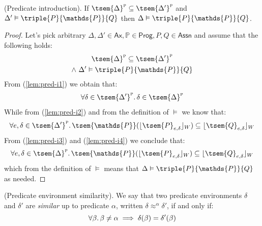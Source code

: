 \begin{lem}
	\label{lem:pred-i}
	(Predicate introduction).
	If $\tsem{\Delta}^\textsc{p} \subseteq \tsem{\Delta'}^\textsc{p}$ and $\Delta' \vDash \triple{P}{\mathds{P}}{Q}$ then $\Delta \vDash \triple{P}{\mathds{P}}{Q}$.
	\begin{proof}
		Let's pick arbitrary $\Delta, \Delta' \in \mathsf{Ax}, \mathds{P} \in \mathsf{Prog}, P, Q \in \mathsf{Assn}$ and assume that the following holds:
		\begin{gather}
			\label{lem:pred-i1} \tsem{\Delta}^\textsc{p} \subseteq \tsem{\Delta'}^\textsc{p} \\
			\label{lem:pred-i2} \land\ \Delta' \vDash \triple{P}{\mathds{P}}{Q}
		\end{gather}
		From (\ref{lem:pred-i1}) we obtain that:
		\begin{gather}
			\label{lem:pred-i3} \forall \delta \in \tsem{\Delta'}^\textsc{p} \ldotp \delta \in \tsem{\Delta}^\textsc{p}
		\end{gather}
		While from (\ref{lem:pred-i2}) and from the definition of $\vDash$ we know that:
		\begin{gather}
			\label{lem:pred-i4} \forall e, \delta \in \tsem{\Delta'}^\textsc{p} \ldotp \tsem{\mathds{P}}(\lfloor \tsem{P}_{e, \delta} \rfloor_W) \subseteq \lfloor \tsem{Q}_{e, \delta} \rfloor_W
		\end{gather}
		From (\ref{lem:pred-i3}) and (\ref{lem:pred-i4}) we conclude that:
		\[
			\forall e, \delta \in \tsem{\Delta}^\textsc{p} \ldotp \tsem{\mathds{P}}(\lfloor \tsem{P}_{e, \delta} \rfloor_W) \subseteq \lfloor \tsem{Q}_{e, \delta} \rfloor_W
		\]
		which from the definition of $\vDash$ means that $\Delta \vDash \triple{P}{\mathds{P}}{Q}$ as needed.
	\end{proof}
\end{lem}

\begin{defn}
	(Predicate environment similarity).
	We say that two predicate environments $\delta$ and $\delta'$ are \emph{similar} up to predicate $\alpha$, written $\delta \approx^\alpha \delta'$, if and only if:
	\[
		\forall \beta \ldotp \beta \neq \alpha \implies \delta(\beta) = \delta'(\beta)
	\]
\end{defn}

